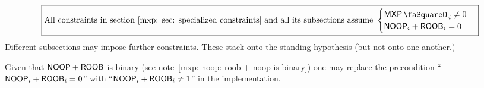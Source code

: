 \[
	\boxed{%
	\text{All constraints in section~\ref{mxp: sec: specialized constraints} and all its subsections assume }%
	\begin{cases}
		\mxpStamp_{i} \neq 0 \\
		\noop_{i} + \roob_{i} = 0 \\
	\end{cases}
	}
\]
Different subsections may impose further constraints. These stack onto the standing hypothesis (but not onto one another.) 

\saNote{} Given that $\textsf{NOOP} + \textsf{ROOB}$ is binary (see note~\ref{mxp: noop: roob + noop is binary}) one may replace the precondition
``$\textsf{NOOP}_{i} + \textsf{ROOB}_{i} =    0$'' with
``$\textsf{NOOP}_{i} + \textsf{ROOB}_{i} \neq 1$'' in the implementation.
